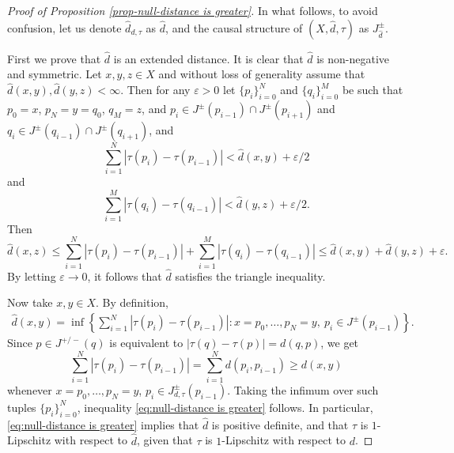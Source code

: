 \documentclass[a4paper,12pt,reqno]{amsart}
\theoremstyle{plain}
\newcommand{\be}{\begin{equation}}
\newcommand{\ee}{\end{equation}}
\begin{document}
\begin{proof}[Proof of Proposition \ref{prop-null-distance is greater}]

In what follows, to avoid confusion, let us denote  $\hat{d}_{d,\tau}$ as $\hat{d}$, and the causal structure of $(X,\hat d,\tau)$ as $J^\pm_{\hat d}$. 

First we prove that $\hat{d}$ is an extended distance. It is clear that $\hat{d}$ is non-negative and symmetric. Let $x,y,z\in X$ and without loss of generality assume that 
$\hat{d}(x,y), \hat{d}(y,z)< \infty$.
Then for any $\varepsilon>0$ let $\{p_i\}_{i=0}^{N}$ and $\{q_i\}_{i=0}^{M}$ be such that $p_0=x$, $p_N = y = q_0$, $q_M=z$, and $p_i\in J^\pm(p_{i-1})\cap J^\pm(p_{i+1})$ and $q_i\in J^\pm(q_{i-1})\cap J^\pm(q_{i+1})$, and 
\be
\sum_{i=1}^{N} |\tau(p_i)-\tau(p_{i-1})| < \hat{d}(x,y) + \varepsilon/2 
\ee
and
\be
\sum_{i=1}^{M} |\tau(q_i)-\tau(q_{i-1})| < \hat{d}(y,z) + \varepsilon/2.
\ee
Then
\be
\hat{d}(x,z) \leq \sum_{i=1}^{N} |\tau(p_i)-\tau(p_{i-1})| +  \sum_{i=1}^{M} |\tau(q_i)-\tau(q_{i-1})| \leq \hat{d}(x,y) + \hat{d}(y,z) + \varepsilon.
\ee
By letting $\varepsilon\to 0$, it follows that $\hat d$ satisfies the triangle inequality. 


Now take $x,y \in X$. By definition,
\begin{align*}
\hat{d}(x,y) = \inf\left\{\sum_{i=1}^{N} |\tau(p_i)-\tau(p_{i-1})|: x = p_0,\dots, p_{N} = y,\ p_{i}\in J^{\pm}(p_{i-1})\right\}.
\end{align*}
Since $p\in J^{+/-}(q)$ is equivalent to $|\tau(q)-\tau(p)| = d(q,p)$, we get
\be
\sum_{i=1}^{N} |\tau(p_i)-\tau(p_{i-1})| = \sum_{i=1}^{N} d(p_i,p_{i-1}) \geq d(x,y)
\ee
whenever $x = p_0,\dots, p_{N} = y$, $p_{i}\in J^\pm_{d,\tau}(p_{i-1})$. Taking the infimum over such tuples $\{p_i\}_{i=0}^{N}$, inequality \eqref{eq:null-distance is greater} follows. In particular, \eqref{eq:null-distance is greater} implies that $\hat{d}$ is positive definite, and 
that $\tau$ is $1$-Lipschitz with respect to $\hat{d}$, given that $\tau$ is $1$-Lipschitz with respect to $d$.





\end{proof}
\end{document}

